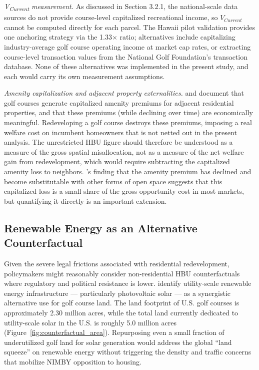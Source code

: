 \documentclass[11pt, letterpaper]{article}
\begin{document}
\textit{V\textsubscript{Current} measurement.} As discussed in Section 3.2.1, the national-scale data sources do not provide course-level capitalized recreational income, so $V_{Current}$ cannot be computed directly for each parcel. The Hawaii pilot validation provides one anchoring strategy via the 1.33$\times$ ratio; alternatives include capitalizing industry-average golf course operating income at market cap rates, or extracting course-level transaction values from the National Golf Foundation's transaction database. None of these alternatives was implemented in the present study, and each would carry its own measurement assumptions.

\textit{Amenity capitalization and adjacent property externalities.} \textcite{Limehouse2012} and \textcite{Cho2009} document that golf courses generate capitalized amenity premiums for adjacent residential properties, and that these premiums (while declining over time) are economically meaningful. Redeveloping a golf course destroys these premiums, imposing a real welfare cost on incumbent homeowners that is not netted out in the present analysis. The unrestricted HBU figure should therefore be understood as a measure of the gross spatial misallocation, not as a measure of the net welfare gain from redevelopment, which would require subtracting the capitalized amenity loss to neighbors. \textcite{Cho2009}'s finding that the amenity premium has declined and become substitutable with other forms of open space suggests that this capitalized loss is a small share of the gross opportunity cost in most markets, but quantifying it directly is an important extension.

\subsection{Renewable Energy as an Alternative Counterfactual}

Given the severe legal frictions associated with residential redevelopment, policymakers might reasonably consider non-residential HBU counterfactuals where regulatory and political resistance is lower. \textcite{Weinand2025} identify utility-scale renewable energy infrastructure --- particularly photovoltaic solar --- as a synergistic alternative use for golf course land. The land footprint of U.S. golf courses is approximately 2.30 million acres, while the total land currently dedicated to utility-scale solar in the U.S. is roughly 5.0 million acres (Figure~\ref{fig:counterfactual_area}). Repurposing even a small fraction of underutilized golf land for solar generation would address the global ``land squeeze'' on renewable energy without triggering the density and traffic concerns that mobilize NIMBY opposition to housing.
\end{document}
